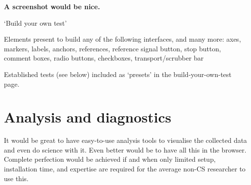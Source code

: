 \documentclass{sig-alternate}
\begin{document}
	
{	\bf A screenshot would be nice. 

	`Build your own test'

	Elements present to build any of the following interfaces, and many more: axes, markers, labels, anchors, references, reference signal button, stop button, comment boxes, radio buttons, checkboxes, transport/scrubber bar

	Established tests (see below) included as `presets' in the build-your-own-test page. }

\section{Analysis and diagnostics}
	It would be great to have easy-to-use analysis tools to visualise the collected data and even do science with it. Even better would be to have all this in the browser. Complete perfection would be achieved if and when only limited setup, installation time, and expertise are required for the average non-CS researcher to use this. 
	
\end{document}
